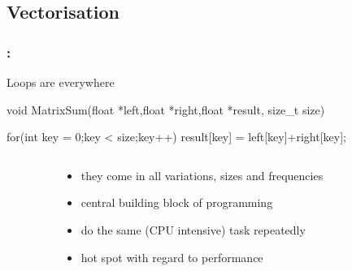 \documentclass[9pt,xcolor=table]{beamer}
\begin{document}
\subsection{Vectorisation}
\begin{frame}[fragile]
\frametitle{\insertsectionhead{}: \insertsubsectionhead{}}
\begin{block}{Loops are everywhere}
  \begin{pyglist}[language=c++,numbers=left,style=emacs]
void MatrixSum(float *left,float *right,float *result, size_t size){
  
  for(int key = 0;key < size;key++){ 
    result[key] = left[key]+right[key]; 
  }
}
  \end{pyglist}
\end{block}
\begin{columns}
  \begin{column}{.1\textwidth}
    \hfill%
  \end{column}
  \begin{column}{.75\textwidth}
    \begin{itemize}[<+->]
    \item they come in all variations, sizes and frequencies
    \item central building block of programming
    \item do the same (CPU intensive) task repeatedly
    \item \alert{hot spot with regard to performance}
    \end{itemize}
  \end{column}
  \begin{column}{.1\textwidth}
    \hfill
  \end{column}
\end{columns}
\end{frame}
\end{document}

